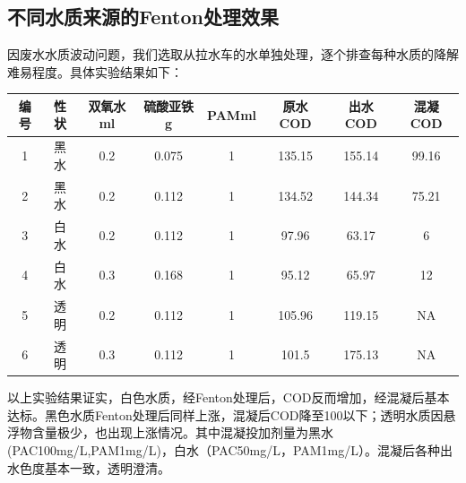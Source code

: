 \subsection{不同水质来源的Fenton处理效果}
因废水水质波动问题，我们选取从拉水车的水单独处理，逐个排查每种水质的降解难易程度。具体实验结果如下：\par
{}
\label{tab2}
\begin{center}
\begin{tabular}{| c | c | c | c | c | c | c | c |}
    \hline
    编号 & 性状 & 双氧水ml & 硫酸亚铁g &  PAMml & 原水COD & 出水COD & 混凝COD\\ \hline 
    1 & 黑水 & 0.2 & 0.075 & 1 & 135.15 & 155.14 & 99.16\\ \hline 
    2 & 黑水 & 0.2 & 0.112 & 1 & 134.52 & 144.34 &  75.21\\ \hline 
    3 & 白水 & 0.2 & 0.112 & 1 & 97.96 & 63.17 & 6\\ \hline 
    4 & 白水 & 0.3 & 0.168 & 1 & 95.12 & 65.97 &  12\\ \hline 
    5 & 透明 & 0.2 & 0.112 & 1 & 105.96 & 119.15 & NA\\ \hline 
    6 & 透明 & 0.3 & 0.112 & 1 & 101.5 & 175.13 & NA\\ \hline 
\end{tabular}
\end{center}
\setlength{\parindent}{2em}
\par
以上实验结果证实，白色水质，经Fenton处理后，COD反而增加，经混凝后基本达标。黑色水质Fenton处理后同样上涨，混凝后COD降至100以下；透明水质因悬浮物含量极少，也出现上涨情况。其中混凝投加剂量为黑水(PAC100mg/L,PAM1mg/L)，白水（PAC50mg/L，PAM1mg/L）。混凝后各种出水色度基本一致，透明澄清。\par
